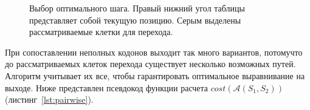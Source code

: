 \begin{figure}[H]
	\begin{minipage}[h]{0.49\linewidth}
	\end{minipage}
	\hfill
	\begin{minipage}[h]{0.49\linewidth}
	\end{minipage}
	\vfill
	\begin{center}
		\begin{minipage}[h]{0.49\linewidth}
		\end{minipage}
	\end{center}
	\caption{Выбор оптимального шага. Правый нижний угол таблицы представляет собой текущую позицию. Серым выделены рассматриваемые клетки для перехода.}
	\label{ris:25variants}
\end{figure}

\indent При сопоставлении неполных кодонов выходит так много вариантов, потомучто до рассматриваемых клеток перехода существует несколько возможных путей. Алгоритм учитывает их все, чтобы гарантировать оптимальное выравнивание на выходе. Ниже представлен псевдокод функции расчета $cost(\mathcal{A}(S_1, S_2))$ (листинг~\ref{lst:pairwise}).

